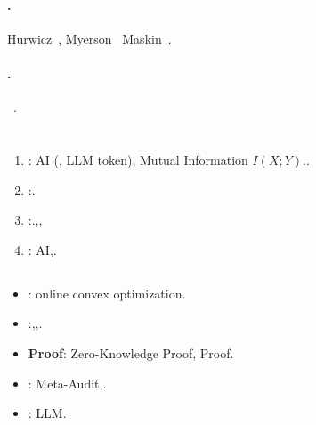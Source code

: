 \documentclass[12pt,a4paper]{article}
\theoremstyle{remark}
\begin{document}
\paragraph{.}
Hurwicz~\cite{hurwicz}, Myerson~\cite{myerson} Maskin~\cite{maskin}.
\paragraph{.}
~\cite{lamport_byzantine,benor}.
\section{}
\subsection{}
\begin{enumerate}[label=(\arabic*),leftmargin=*]
 \item : AI (, LLM token), 
 Mutual Information $I(X;Y)$..
 \item :.
 \item :.,, 
 \item : AI,.
\end{enumerate}
\subsection{}
\begin{itemize}
 \item : online convex optimization.
 \item :,,.
 \item \textbf{Proof}: Zero-Knowledge Proof, Proof.
 \item : Meta-Audit,.
 \item : LLM.
\end{itemize}
\end{document}
